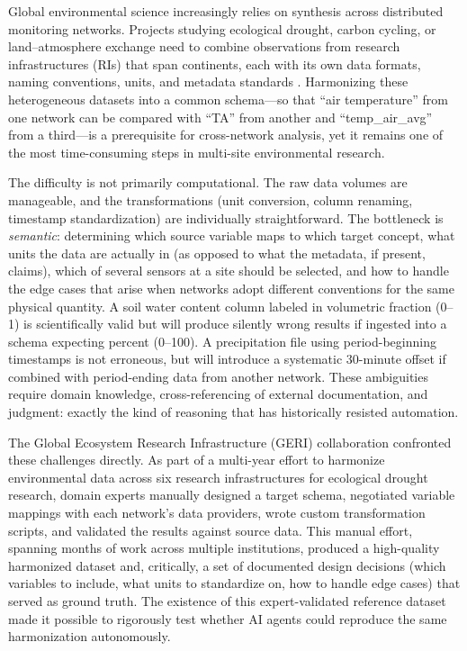 \documentclass[review,authoryear]{elsarticle}
\begin{document}
Global environmental science increasingly relies on synthesis across distributed monitoring networks. Projects studying ecological drought, carbon cycling, or land--atmosphere exchange need to combine observations from research infrastructures (RIs) that span continents, each with its own data formats, naming conventions, units, and metadata standards \citep{wilkinson2016fair, pastorello2020fluxnet}. Harmonizing these heterogeneous datasets into a common schema---so that ``air temperature'' from one network can be compared with ``TA'' from another and ``temp\_air\_avg'' from a third---is a prerequisite for cross-network analysis, yet it remains one of the most time-consuming steps in multi-site environmental research.

The difficulty is not primarily computational. The raw data volumes are manageable, and the transformations (unit conversion, column renaming, timestamp standardization) are individually straightforward. The bottleneck is \emph{semantic}: determining which source variable maps to which target concept, what units the data are actually in (as opposed to what the metadata, if present, claims), which of several sensors at a site should be selected, and how to handle the edge cases that arise when networks adopt different conventions for the same physical quantity. A soil water content column labeled in volumetric fraction (0--1) is scientifically valid but will produce silently wrong results if ingested into a schema expecting percent (0--100). A precipitation file using period-beginning timestamps is not erroneous, but will introduce a systematic 30-minute offset if combined with period-ending data from another network. These ambiguities require domain knowledge, cross-referencing of external documentation, and judgment: exactly the kind of reasoning that has historically resisted automation.

The Global Ecosystem Research Infrastructure (GERI) collaboration confronted these challenges directly. As part of a multi-year effort to harmonize environmental data across six research infrastructures for ecological drought research, domain experts manually designed a target schema, negotiated variable mappings with each network's data providers, wrote custom transformation scripts, and validated the results against source data. This manual effort, spanning months of work across multiple institutions, produced a high-quality harmonized dataset and, critically, a set of documented design decisions (which variables to include, what units to standardize on, how to handle edge cases) that served as ground truth. The existence of this expert-validated reference dataset made it possible to rigorously test whether AI agents could reproduce the same harmonization autonomously.
\end{document}
